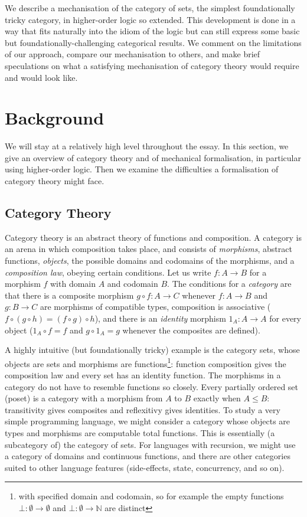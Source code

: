 \documentclass[twoside,titlepage,11pt]{article}
\begin{document}
We describe a mechanisation of the category of sets, the simplest foundationally tricky category, in higher-order logic so extended.
This development is done in a way that fits naturally into the idiom of the logic but can still express some basic but foundationally-challenging categorical results.
We comment on the limitations of our approach, compare our mechanisation to others, and make brief speculations on what a satisfying mechanisation of category theory would require and would look like.
\section{Background}%
We will stay at a relatively high level throughout the essay.
In this section, we give an overview of category theory and of mechanical formalisation, in particular using higher-order logic.
Then we examine the difficulties a formalisation of category theory might face.
\subsection{Category Theory}%
Category theory is an abstract theory of functions and composition.
A category is an arena in which composition takes place, and consists of \emph{morphisms}, abstract functions, \emph{objects}, the possible domains and codomains of the morphisms, and a \emph{composition law}, obeying certain conditions.
Let us write $f:A\to B$ for a morphism $f$ with domain $A$ and codomain $B$.
The conditions for a \emph{category} are that there is a composite morphism $g\circ f:A\to C$ whenever $f:A\to B$ and $g:B\to C$ are morphisms of compatible types, composition is associative ($f\circ(g\circ h)=(f\circ g)\circ h$), and there is an \emph{identity} morphism ${1_A}:A\to A$ for every object (${1_A}\circ f=f$ and $g\circ{1_A}=g$ whenever the composites are defined).

A highly intuitive (but foundationally tricky) example is the category sets, whose objects are sets and morphisms are functions\footnote{with specified domain and codomain, so for example the empty functions $\bot:\emptyset\to\emptyset$ and $\bot:\emptyset\to\mathbb{N}$ are distinct}: function composition gives the composition law and every set has an identity function.
The morphisms in a category do not have to resemble functions so closely.
Every partially ordered set (poset) is a category with a morphism from $A$ to $B$ exactly when $A\leq B$: transitivity gives composites and reflexitivy gives identities.
To study a very simple programming language, we might consider a category whose objects are types and morphisms are computable total functions.
This is essentially (a subcategory of) the category of sets.
For languages with recursion, we might use a category of domains and continuous functions, and there are other categories suited to other language features (side-effects, state, concurrency, and so on).
\end{document}
